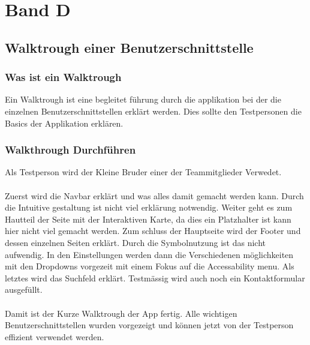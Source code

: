 \documentclass[10pt]{article}
\begin{document}
	\section{Band D}
	\subsection {Walktrough einer Benutzerschnittstelle}
	\subsubsection{Was ist ein Walktrough}
	Ein Walktrough ist eine begleitet führung durch die applikation bei der die einzelnen Benutzerschnittstellen erklärt werden. Dies sollte den Testpersonen die Basics der Applikation erklären.
	\subsubsection{Walkthrough Durchführen}
	Als Testperson wird der Kleine Bruder einer der Teammitglieder Verwedet.\\\\
	Zuerst wird die Navbar erklärt und was alles damit gemacht werden kann. Durch die Intuitive gestaltung ist nicht viel erklärung notwendig. Weiter geht es zum Hautteil der Seite mit der Interaktiven Karte, da dies ein Platzhalter ist kann hier nicht viel gemacht werden. Zum schluss der Hauptseite wird der Footer und dessen einzelnen Seiten erklärt. Durch die Symbolnutzung ist das nicht aufwendig. In den Einstellungen werden dann die Verschiedenen möglichkeiten mit den Dropdowns vorgezeit mit einem Fokus auf die Accessability menu. Als letztes wird das Suchfeld erklärt. Testmässig wird auch noch ein Kontaktformular ausgefüllt.\\\\
	Damit ist der Kurze Walktrough der App fertig. Alle wichtigen Benutzerschnittstellen wurden vorgezeigt und können jetzt von der Testperson effizient verwendet werden.
\end{document}
